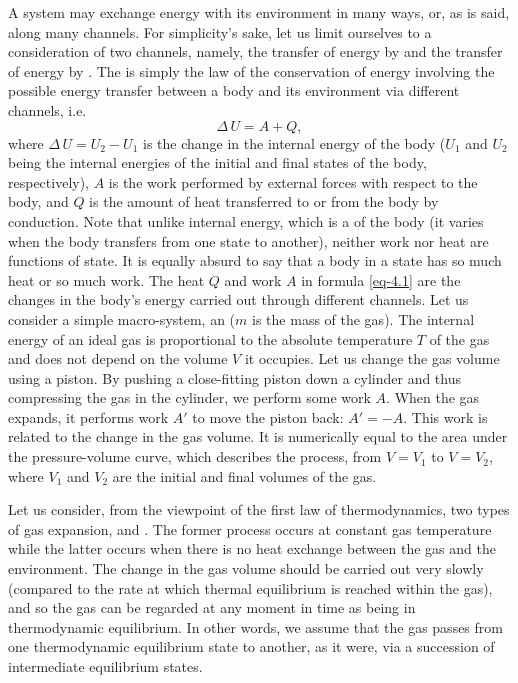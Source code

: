  A system may exchange energy with its environment in many ways, or, as is said, along many channels. For simplicity's sake, let us limit ourselves to a consideration of two channels, namely, the transfer of energy by  and the transfer of energy by . The  is simply the law of the conservation of energy involving the possible energy transfer between a body and its environment via different channels, i.e.
\begin{equation}%
\Delta \, U = A + Q,
\label{eq-4.1}
\end{equation}
where $ \Delta \, U = U_{2} - U_{1}$ is the change in the internal energy of the body ($U_{1}$ and $U_{2}$ being the internal energies of the initial and final states of the body, respectively), $A$ is the work performed by external forces with respect to the body, and $Q$ is the amount of heat transferred to or from the body by conduction. Note that unlike internal energy, which is a  of the body (it varies when the body transfers from one state to another), neither work nor heat are functions of state. It is equally absurd to say that a body in a state has so much heat or so much work. The heat $Q$ and work $A$ in formula \eqref{eq-4.1} are the changes in the body's energy carried out through different channels. Let us consider a simple macro-system, an  ($m$ is the mass of the gas). The internal energy of an ideal gas is proportional to the absolute temperature $T$ of the gas and does not depend on the volume $V$ it occupies. Let us change the gas volume using a piston. By pushing a close-fitting piston down a cylinder and thus compressing the gas in the cylinder, we perform some work $A$. When the gas expands, it performs	work 	$A'$ to move the piston back: $A' = - A$. This work is related to the change in the gas volume. It is numerically equal to the area under the pressure-volume curve, which describes the process, from $V= V_{1}$ to $V= V_{2}$, where $V_{1}$ and $V_{2}$ are the initial and final volumes of the gas.

Let us consider, from the viewpoint of the first law of thermodynamics, two types of gas expansion,  and . The former process occurs at constant gas temperature while the latter occurs when there is no heat exchange between the gas and the environment. The change in the gas volume should be carried out very slowly (compared to the rate at which thermal equilibrium is reached within the gas), and so the gas can be regarded at any moment in time as being in thermodynamic equilibrium. In other words, we assume that the gas passes from one thermodynamic equilibrium state to another, as it were, via a succession of intermediate equilibrium states.

